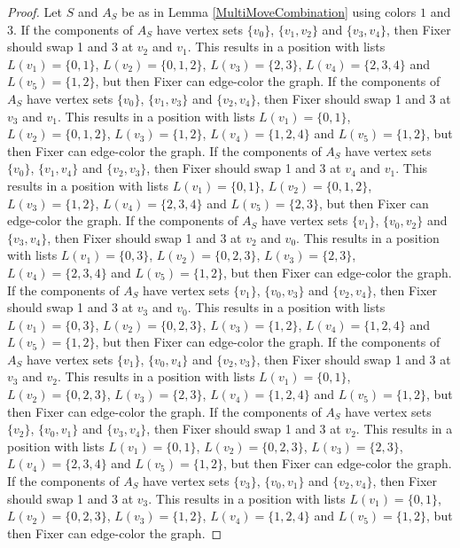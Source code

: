 \documentclass[12pt]{amsart}
\theoremstyle{plain}
\theoremstyle{definition}
\theoremstyle{remark}
\begin{document}
\begin{proof}
Let $S$ and $A_S$ be as in Lemma \ref{MultiMoveCombination} using colors $1$ and $3$. If the components of $A_S$ have vertex sets $\{v_0\}$, $\{v_1, v_2\}$ and $\{v_3, v_4\}$, then Fixer should swap 1 and 3 at $v_2$ and $v_1$. This results in a position with lists $L(v_1) = \{0, 1\}$, $L(v_2) = \{0, 1, 2\}$, $L(v_3) = \{2, 3\}$, $L(v_4) = \{2, 3, 4\}$ and $L(v_5) = \{1, 2\}$, but then Fixer can edge-color the graph.
If the components of $A_S$ have vertex sets $\{v_0\}$, $\{v_1, v_3\}$ and $\{v_2, v_4\}$, then Fixer should swap 1 and 3 at $v_3$ and $v_1$. This results in a position with lists $L(v_1) = \{0, 1\}$, $L(v_2) = \{0, 1, 2\}$, $L(v_3) = \{1, 2\}$, $L(v_4) = \{1, 2, 4\}$ and $L(v_5) = \{1, 2\}$, but then Fixer can edge-color the graph.
If the components of $A_S$ have vertex sets $\{v_0\}$, $\{v_1, v_4\}$ and $\{v_2, v_3\}$, then Fixer should swap 1 and 3 at $v_4$ and $v_1$. This results in a position with lists $L(v_1) = \{0, 1\}$, $L(v_2) = \{0, 1, 2\}$, $L(v_3) = \{1, 2\}$, $L(v_4) = \{2, 3, 4\}$ and $L(v_5) = \{2, 3\}$, but then Fixer can edge-color the graph.
If the components of $A_S$ have vertex sets $\{v_1\}$, $\{v_0, v_2\}$ and $\{v_3, v_4\}$, then Fixer should swap 1 and 3 at $v_2$ and $v_0$. This results in a position with lists $L(v_1) = \{0, 3\}$, $L(v_2) = \{0, 2, 3\}$, $L(v_3) = \{2, 3\}$, $L(v_4) = \{2, 3, 4\}$ and $L(v_5) = \{1, 2\}$, but then Fixer can edge-color the graph.
If the components of $A_S$ have vertex sets $\{v_1\}$, $\{v_0, v_3\}$ and $\{v_2, v_4\}$, then Fixer should swap 1 and 3 at $v_3$ and $v_0$. This results in a position with lists $L(v_1) = \{0, 3\}$, $L(v_2) = \{0, 2, 3\}$, $L(v_3) = \{1, 2\}$, $L(v_4) = \{1, 2, 4\}$ and $L(v_5) = \{1, 2\}$, but then Fixer can edge-color the graph.
If the components of $A_S$ have vertex sets $\{v_1\}$, $\{v_0, v_4\}$ and $\{v_2, v_3\}$, then Fixer should swap 1 and 3 at $v_3$ and $v_2$. This results in a position with lists $L(v_1) = \{0, 1\}$, $L(v_2) = \{0, 2, 3\}$, $L(v_3) = \{2, 3\}$, $L(v_4) = \{1, 2, 4\}$ and $L(v_5) = \{1, 2\}$, but then Fixer can edge-color the graph.
If the components of $A_S$ have vertex sets $\{v_2\}$, $\{v_0, v_1\}$ and $\{v_3, v_4\}$, then Fixer should swap 1 and 3 at $v_2$. This results in a position with lists $L(v_1) = \{0, 1\}$, $L(v_2) = \{0, 2, 3\}$, $L(v_3) = \{2, 3\}$, $L(v_4) = \{2, 3, 4\}$ and $L(v_5) = \{1, 2\}$, but then Fixer can edge-color the graph.
If the components of $A_S$ have vertex sets $\{v_3\}$, $\{v_0, v_1\}$ and $\{v_2, v_4\}$, then Fixer should swap 1 and 3 at $v_3$. This results in a position with lists $L(v_1) = \{0, 1\}$, $L(v_2) = \{0, 2, 3\}$, $L(v_3) = \{1, 2\}$, $L(v_4) = \{1, 2, 4\}$ and $L(v_5) = \{1, 2\}$, but then Fixer can edge-color the graph.

\end{proof}
\end{document}
